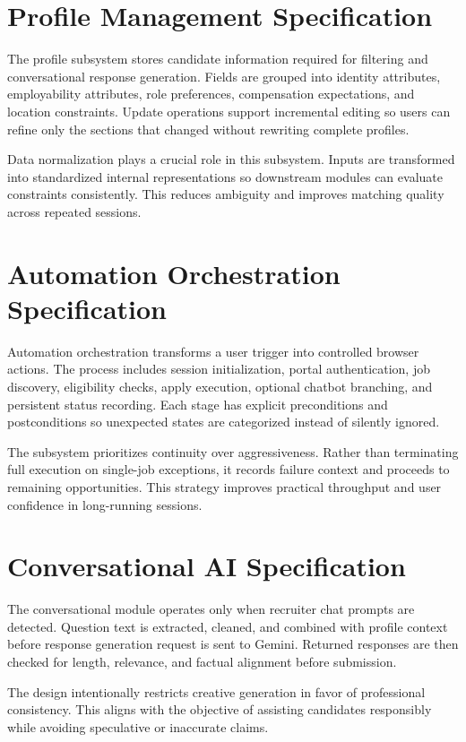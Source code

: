 \documentclass[12pt,a4paper,oneside]{report}
\begin{document}
\section{Profile Management Specification}
The profile subsystem stores candidate information required for filtering and conversational response generation. Fields are grouped into identity attributes, employability attributes, role preferences, compensation expectations, and location constraints. Update operations support incremental editing so users can refine only the sections that changed without rewriting complete profiles.

Data normalization plays a crucial role in this subsystem. Inputs are transformed into standardized internal representations so downstream modules can evaluate constraints consistently. This reduces ambiguity and improves matching quality across repeated sessions.

\section{Automation Orchestration Specification}
Automation orchestration transforms a user trigger into controlled browser actions. The process includes session initialization, portal authentication, job discovery, eligibility checks, apply execution, optional chatbot branching, and persistent status recording. Each stage has explicit preconditions and postconditions so unexpected states are categorized instead of silently ignored.

The subsystem prioritizes continuity over aggressiveness. Rather than terminating full execution on single-job exceptions, it records failure context and proceeds to remaining opportunities. This strategy improves practical throughput and user confidence in long-running sessions.

\section{Conversational AI Specification}
The conversational module operates only when recruiter chat prompts are detected. Question text is extracted, cleaned, and combined with profile context before response generation request is sent to Gemini. Returned responses are then checked for length, relevance, and factual alignment before submission.

The design intentionally restricts creative generation in favor of professional consistency. This aligns with the objective of assisting candidates responsibly while avoiding speculative or inaccurate claims.
\end{document}
